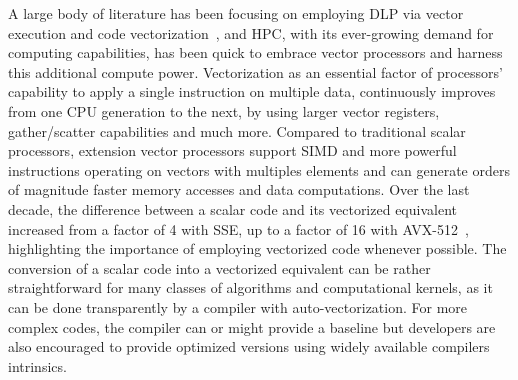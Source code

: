 \documentclass[5p,times,twocolumn]{elsarticle}
\begin{document}
A large body of literature has been focusing on employing DLP via vector
execution and code vectorization~\cite{VectorizingCompilers1,vectorizingcompilers,SIMDVectorOperations}, and HPC, with its ever-growing demand for computing capabilities, has been quick to embrace vector processors and harness this additional compute power.
Vectorization as an essential factor of processors' capability to apply
a single instruction on multiple data, continuously improves
from one CPU generation to the next, by using larger vector registers, gather/scatter capabilities and much more.
Compared to traditional scalar processors, extension vector processors support
SIMD and more powerful instructions operating
on vectors with multiples elements and can generate orders of magnitude faster memory accesses and data computations.
Over the last decade, the difference between a scalar code and its vectorized equivalent
increased from a factor of 4 with SSE, up to a factor of 16 with AVX-512~\cite{PentiumIII,Haswelldetail,avx-info}, highlighting the importance of employing vectorized code whenever possible.
The conversion of a scalar code into a vectorized
equivalent can be rather straightforward for many classes of algorithms
and computational kernels, as it can be done transparently by a compiler
with auto-vectorization. For more complex codes, the compiler can or might
provide a baseline but developers are also encouraged to provide optimized
versions using widely available compilers intrinsics.
%
\end{document}
